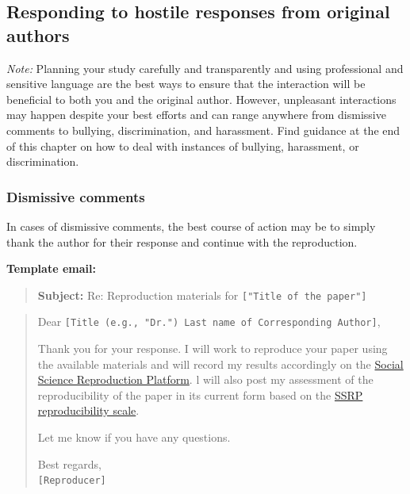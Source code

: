 \documentclass[
]{book}
\begin{document}
\hypertarget{responding-to-hostile-responses-from-original-authors}{%
\subsection{Responding to hostile responses from original authors}\label{responding-to-hostile-responses-from-original-authors}}

\emph{Note:} Planning your study carefully and transparently and using professional and sensitive language are the best ways to ensure that the interaction will be beneficial to both you and the original author. However, unpleasant interactions may happen despite your best efforts and can range anywhere from dismissive comments to bullying, discrimination, and harassment. Find guidance at the end of this chapter on how to deal with instances of bullying, harassment, or discrimination.

\hypertarget{dismissive-comments}{%
\subsubsection{Dismissive comments}\label{dismissive-comments}}

In cases of dismissive comments, the best course of action may be to simply thank the author for their response and continue with the reproduction.

\textbf{Template email:}

\begin{quote}
\textbf{Subject:} Re: Reproduction materials for \texttt{{[}"Title\ of\ the\ paper"{]}}
\end{quote}

\begin{quote}
Dear \texttt{{[}Title\ (e.g.,\ "Dr.")\ Last\ name\ of\ Corresponding\ Author{]}},

Thank you for your response. I will work to reproduce your paper using the available materials and will record my results accordingly on the \href{https://www.socialsciencereproduction.org/}{Social Science Reproduction Platform}. l will also post my assessment of the reproducibility of the paper in its current form based on the \href{https://bitss.github.io/ACRE/assessment.html\#levels-of-computational-reproducibility-for-a-specific-output}{SSRP reproducibility scale}.

Let me know if you have any questions.

Best regards,\\
\texttt{{[}Reproducer{]}}
\end{quote}
\end{document}
